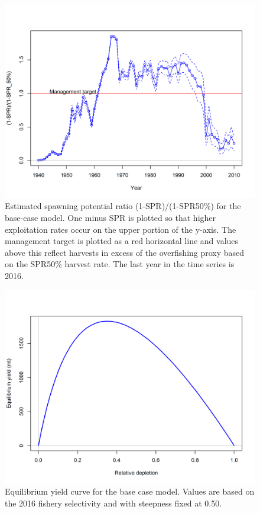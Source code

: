 \documentclass[12pt,]{article}
\begin{document}
\FloatBarrier

\begin{figure}
\centering
\includegraphics{r4ss/plots_mod1/SPR3_ratiointerval.png}
\caption{Estimated spawning potential ratio (1-SPR)/(1-SPR50\%) for the
base-case model. One minus SPR is plotted so that higher exploitation
rates occur on the upper portion of the y-axis. The management target is
plotted as a red horizontal line and values above this reflect harvests
in excess of the overfishing proxy based on the SPR50\% harvest rate.
The last year in the time series is 2016. \label{fig:SPR}}
\end{figure}

\FloatBarrier

\begin{figure}
\centering
\includegraphics{r4ss/plots_mod1/yield1_yield_curve.png}
\caption{Equilibrium yield curve for the base case model. Values are
based on the 2016 fishery selectivity and with steepness fixed at 0.50.
\label{fig:yield}}
\end{figure}
\end{document}
